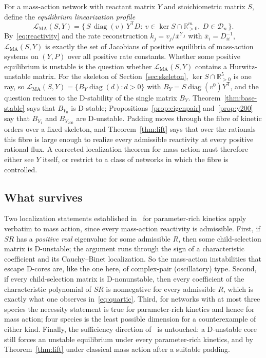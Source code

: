 \documentclass[11pt,a4paper]{article}
\theoremstyle{plain}
\theoremstyle{definition}
\theoremstyle{remark}
\newcommand{\R}{\mathbb{R}}
\newcommand{\diag}{\operatorname{diag}}
\newcommand{\xbar}{\bar{x}}
\newcommand{\LMA}{\mathcal{L}_{\mathrm{MA}}}
\begin{document}
For a mass-action network with reactant matrix $Y$ and stoichiometric matrix $S$, define the \emph{equilibrium linearization profile}
\begin{equation}\label{eq:profile}
  \LMA(S,Y)=\bigl\{\,S\,\diag(v)\,Y^{\mathsf T}D:\ v\in\ker S\cap\R^m_{>0},\ D\in\mathcal D_n\,\bigr\}.
\end{equation}
By~\eqref{eq:reactivity} and the rate reconstruction $k_j=v_j/\xbar^{Y_{\cdot j}}$ with $\xbar_i=D_{ii}^{-1}$, $\LMA(S,Y)$ is exactly the set of Jacobians of positive equilibria of mass-action systems on $(Y,P)$ over all positive rate constants. Whether some positive equilibrium is unstable is the question whether $\LMA(S,Y)$ contains a Hurwitz-unstable matrix. For the skeleton of Section~\ref{sec:skeleton}, $\ker S\cap\R^5_{>0}$ is one ray, so $\LMA(S,Y)=\{B_Y\diag(d):d>0\}$ with $B_Y=S\diag(v^0)Y^{\mathsf T}$, and the question reduces to the D-stability of the single matrix $B_Y$. Theorem~\ref{thm:base-stable} says that $B_{Y_0}$ is D-stable; Propositions~\ref{prop:eigenpair} and~\ref{prop:y200} say that $B_{Y_1}$ and $B_{Y_{200}}$ are D-unstable. Padding moves through the fibre of kinetic orders over a fixed skeleton, and Theorem~\ref{thm:lift} says that over the rationals this fibre is large enough to realize every admissible reactivity at every positive rational flux. A corrected localization theorem for mass action must therefore either see $Y$ itself, or restrict to a class of networks in which the fibre is controlled.

\subsection{What survives}\label{sec:survives}

Two localization statements established in~\cite{Companion2026} for parameter-rich kinetics apply verbatim to mass action, since every mass-action reactivity is admissible. First, if $SR$ has a \emph{positive real} eigenvalue for some admissible $R$, then some child-selection matrix is D-unstable; the argument runs through the sign of a characteristic coefficient and its Cauchy--Binet localization. So the mass-action instabilities that escape D-cores are, like the one here, of complex-pair (oscillatory) type. Second, if every child-selection matrix is D-nonunstable, then every coefficient of the characteristic polynomial of $SR$ is nonnegative for every admissible $R$, which is exactly what one observes in~\eqref{eq:quartic}. Third, for networks with at most three species the necessity statement is true for parameter-rich kinetics and hence for mass action; four species is the least possible dimension for a counterexample of either kind. Finally, the sufficiency direction of~\cite{VassenaStadler2024} is untouched: a D-unstable core still forces an unstable equilibrium under every parameter-rich kinetics, and by Theorem~\ref{thm:lift} under classical mass action after a suitable padding.
\end{document}
